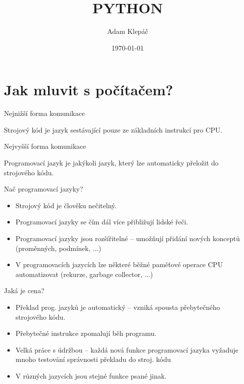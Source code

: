 \documentclass[aspectratio=169,11pt]{beamer}
\title{PYTHON}
\date{\today}
\author{Adam Klepáč}
\institute[GEVO]{Gymnázium Evolution Jižní Město}
\begin{document}
\maketitle

\section[Programovací jazyky]{Jak mluvit s počítačem?}

\begin{frame}[plain]
 \sectionpage
\end{frame}

\begin{frame}{Nejnižší forma komunikace}
 \begin{tcolorbox}[title=Strojový kód]
  Strojový kód je jazyk sestávající pouze ze \alert{základních instrukcí} pro
  CPU.
 \end{tcolorbox}
\end{frame}

\begin{frame}{Nejvyšší forma komunikace}
 \begin{tcolorbox}[title=Programovací jazyk]
  Programovací jazyk je jakýkoli jazyk, který lze \alert{automaticky přeložit}
  do strojového kódu.
 \end{tcolorbox}
\end{frame}

\begin{frame}{Nač programovací jazyky?}
 \begin{itemize}
  \item<1-> Strojový kód je člověku nečitelný.
  \item<2-> Programovací jazyky se čím dál více přibližují lidské řeči.
  \item<3-> Programovací jazyky jsou rozšířitelné -- umožňují přidání nových
   konceptů (proměnných, podmínek, ...)
  \item<4-> V programovacích jazycích lze některé běžné paměťové operace CPU
   automatizovat (rekurze, garbage collector, ...)
 \end{itemize}
\end{frame}

\begin{frame}{Jaká je cena?}
 \begin{itemize}
  \item<1-> Překlad prog. jazyků je automatický -- vzniká spousta přebytečného
   strojového kódu.
  \item<2-> Přebytečné instrukce zpomalují běh programu.
  \item<3-> Velká práce s údržbou -- každá nová funkce programovací jazyka
   vyžaduje mnoho testování správnosti překladu do stroj. kódu
  \item<4-> V různých jazycích jsou stejné funkce psané jinak.
 \end{itemize}
\end{frame}
\end{document}
